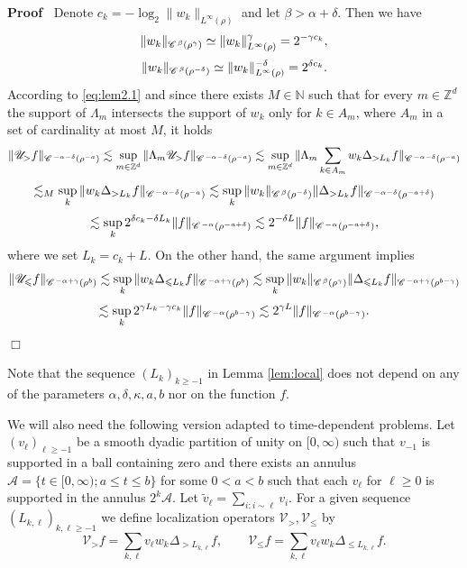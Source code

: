 \documentclass[a4paper,11pt]{article}
\renewcommand{\leq}{\leqslant}
\renewcommand{\geq}{\geqslant}
\newenvironment{proof}{\noindent\textbf{Proof\ }}{\hspace*{\fill}$\Box$\medskip}
\numberwithin{equation}{section}
\newcommand{\CC}{\mathscr{C} \hspace{.1em}}
\newcommand{\UU}{\mathscr{U}}
\newcommand{\VV}{\mathscr{V}}
\newcommand{\N}{\mathbb{N}}
\newcommand{\8}{\infty}
\begin{document}
\begin{proof}
  Denote $c_k = - \log_2 \|  w_k \|_{L^{\infty} (\rho)}$ and let $\beta>\alpha+\delta$. Then we have
  \[ \|  w_k \|_{\CC^{\beta} (\rho^{\gamma})} \simeq \|  w_k \|_{L^{\infty}
     (\rho)}^{\gamma} = 2^{- \gamma c_k}, \]
  \[ \|  w_k \|_{\CC^{\beta} (\rho^{- \delta})} \simeq \|  w_k
     \|_{L^{\infty} (\rho)}^{- \delta} = 2^{\delta c_k} . \]
According to \eqref{eq:lem2.1}    and since there exists $M\in\N$ such that for every $m\in\mathbb{Z}^{d}$  the support of $\Lambda_{m}$ intersects the support of $w_{k}$ only for $k\in A_{m}$, where $A_{m}$ in a set of cardinality at most $M$, it holds 
  \[ \| \UU_{>} f \|_{\CC^{-\alpha - \delta} (\rho^{- a})} \lesssim
     \sup_{m\in\mathbb{Z}^{d}}\|\Lambda_{m}\UU_{>}f\|_{\CC^{ -\alpha - \delta} (\rho^{- a})}\lesssim \sup_{m\in\mathbb{Z}^{d}}\|\Lambda_{m}\sum_{k\in A_{m}}w_{k}\Delta_{>L_{k}}f\|_{\CC^{-\alpha - \delta} (\rho^{- a})}\]
 \[  \lesssim_{M} \sup_{k}\|  w_k \Delta_{> L_k} f \|_{\CC^{ -\alpha - \delta} (\rho^{- a})}
     \lesssim \sup_k \|  w_k \|_{\CC^{\beta} (\rho^{-\delta})}
     \| \Delta_{> L_k} f \|_{\CC^{ -\alpha - \delta} (\rho^{-a+\delta})} \]
  \[ \lesssim \sup_k 2^{\delta c_k - \delta L_k} \| f \|_{\CC^{- \alpha}
     (\rho^{-a+\delta})} \lesssim 2^{- \delta L} \| f \|_{\CC^{- \alpha}
     (\rho^{-a+\delta})}, \]
where we set $L_k =  c_k+ L$.
  On the other hand, the same argument implies
  \[ \| \UU_{\leqslant} f \|_{\CC^{-\alpha+\gamma} (\rho^b)} \lesssim \sup_k
     \|  w_k \Delta_{\leqslant L_k} f \|_{\CC^{-\alpha+\gamma} (\rho^b)} \lesssim
     \sup_k \|  w_k \|_{\CC^{\beta} (\rho^{\gamma})} \| \Delta_{\leqslant
     L_k} f \|_{\CC^{-\alpha+\gamma} (\rho^{b-\gamma})} \]
  \[ \lesssim \sup_k 2^{\gamma L_k - \gamma c_k} \| f
     \|_{\CC^{-\alpha} (\rho^{b-\gamma})} \lesssim 2^{\gamma L} \| f \|_{\CC^{- \alpha}
     (\rho^{b-\gamma})}.\]
\end{proof}

\begin{remark}
     Note that the sequence $(L_k)_{k\geq -1}$ in Lemma \ref{lem:local} does not depend on any of the parameters $\alpha,\delta,\kappa,a,b$ nor on the function $f$.

\end{remark}





We will also need the following version adapted to time-dependent problems. Let $(v_{\ell})_{\ell\geq -1}$ be a smooth dyadic partition of unity on $[0,\8)$ such that  $v_{-1}$ is supported in a ball containing zero and there exists an annulus $\mathcal{A}=\{t\in[0,\infty);a\leq t\leq b\}$ for some $0<a<b$ such that each $v_\ell$ for $\ell\geq0$ is supported in the annulus $2^k\mathcal{A}$. 
Let $\tilde v_{\ell}=\sum_{i:i\sim\ell}v_{i}$.
 For a given sequence $(L_{k,\ell})_{k,\ell\geq -1}$  we define localization operators $\VV_{>},
\VV_{\leqslant}$  by
\begin{equation}\label{eq:locd}
\VV_{>} f = \sum_{k,\ell} v_{\ell}w_k \Delta_{> L_{k,\ell}} f, \qquad
   \VV_{\leqslant} f = \sum_{k,\ell} v_{\ell}w_k \Delta_{\leqslant L_{k,\ell}} f.
   \end{equation}
\end{document}
